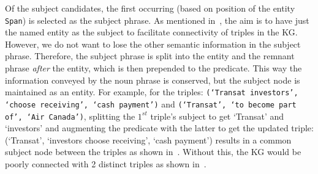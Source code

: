 Of the subject candidates, the first occurring (based on position of the entity \texttt{Span}) is selected as the subject phrase. As mentioned in~, the aim is to have just the named entity as the subject to facilitate connectivity of triples in the KG. However, we do not want to lose the other semantic information in the subject phrase. Therefore, the subject phrase is split into the entity and the remnant phrase \textit{after} the entity, which is then prepended to the predicate. This way the information conveyed by the noun phrase is conserved, but the subject node is maintained as an entity. For example, for the triples: \texttt{(`Transat investors', `choose receiving', `cash payment')} and \texttt{(`Transat', `to become part of', `Air Canada')}, splitting the $1^{st}$ triple's subject to get `Transat' and `investors' and augmenting the predicate with the latter to get the updated triple: (`Transat', `investors choose receiving', `cash payment') results in a common subject node between the triples as shown in~. Without this, the KG would be poorly connected with 2 distinct triples as shown in~.
  
